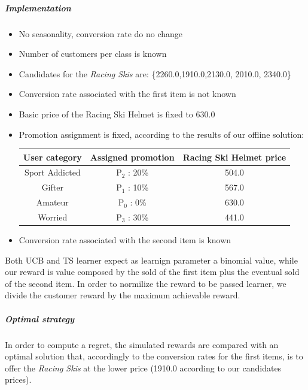 \subparagraph{Implementation} 
\begin{itemize}
	\item No seasonality, conversion rate do no change
	\item Number of customers per class is known 
	\item Candidates for the \textit{Racing Skis} are: \{2260.0,1910.0,2130.0, 2010.0, 2340.0\}
	\item Conversion rate associated with the first item is not known
	\item Basic price of the Racing Ski Helmet is fixed to 630.0
	\item Promotion assignment is fixed, according to the results of our offline solution: 
	\begin{center}
		\begin{tabular}{ |c|c|c|} 
		\hline
		User category & Assigned promotion & Racing Ski Helmet price \\
		\hline
		Sport Addicted & P$_2$ : 20\% & 504.0 \\
		\hline
		Gifter & P$_1$ : 10\% & 567.0 \\
		\hline
		Amateur & P$_0$ : 0\% & 630.0 \\
		\hline
		Worried & P$_3$ : 30\% & 441.0 \\
		\hline
		\end{tabular}
	\end{center}
	\item Conversion rate associated with the second item is known
\end{itemize}

Both UCB and TS learner expect as learnign parameter a binomial value, while our reward is value composed by the sold of the first item plus the eventual sold of the second item. In order to normilize the reward to be passed learner, we divide the customer reward by the maximum achievable reward.   

\subparagraph{Optimal strategy}In order to compute a regret, the simulated rewards are compared with an optimal solution that, accordingly to the conversion rates for the first items, is to offer the \textit{Racing Skis} at the lower price (1910.0 according to our candidates prices). 

